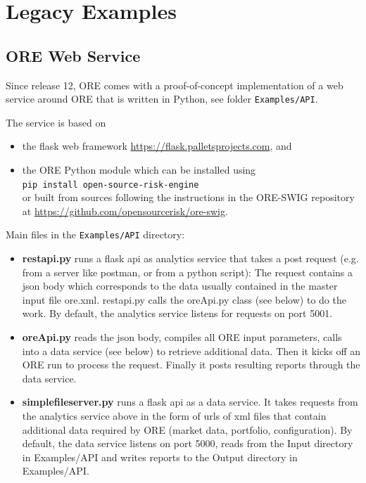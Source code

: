 \section{Legacy Examples}\label{sec:legacyexamples}

\setcounter{subsection}{-1}
\subsection{ORE Web Service}\label{sec:service}

Since release 12, ORE comes with a proof-of-concept implementation of a web service around ORE
that is written in Python, see folder {\tt Examples/API}.

The service is based on
\begin{itemize}
\item the flask web framework \url{https://flask.palletsprojects.com}, and
\item the ORE Python module which can be installed using \\
  {\tt pip install open-source-risk-engine} \\
  or built from sources following the instructions in the ORE-SWIG repository
  at \url{https://github.com/opensourcerisk/ore-swig}.
\end{itemize}

\medskip
Main files in the {\tt Examples/API} directory:
\begin{itemize}
\item {\bf restapi.py} runs a flask api as analytics service that takes a post request
  (e.g. from a server like postman, or from a python script): The request contains a json body
  which corresponds to the data usually contained in the master input file ore.xml. restapi.py
  calls the oreApi.py class (see below) to do the work. By default, the analytics service listens for
  requests on port 5001.
\item {\bf oreApi.py} reads the json body, compiles all ORE input parameters, calls into a
  data service (see below) to retrieve additional data. Then it kicks off an ORE run to process
  the request.  Finally it posts resulting reports through the data service.
\item {\bf simplefileserver.py} runs a flask api as a data service. It takes requests from the
  analytics service above in the form of urls of xml files that contain additional data required
  by ORE (market data, portfolio, configuration). By default, the data service
  listens on port 5000, reads from the Input directory in Examples/API and writes reports to the Output
  directory in Examples/API.
\end{itemize}

